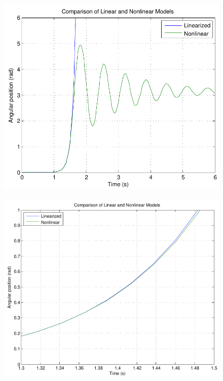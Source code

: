 \begin{minipage}{\linewidth}
	\begin{minipage}{0.45\linewidth}
		\begin{figure}[H]
			\includegraphics[scale=.48]{figures/LinearizedVSNonlinear}
			\centering
			\vspace{-.4cm}
			\captionsetup{justification=centering}
			\label{LinearizedVSNonlinear}
		\end{figure}\vspace{-5mm}
	\end{minipage}
	\hspace{0.03\linewidth}
	\begin{minipage}{0.45\linewidth}
		\begin{figure}[H]
			\includegraphics[scale=.4]{figures/LinearizedVSNonlinearZoom}

\end{figure}
\end{minipage}
\end{minipage}
